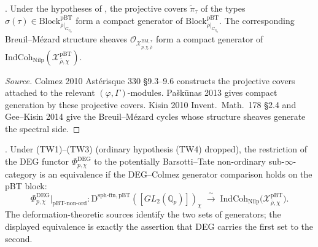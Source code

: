 \begin{lemma}
\label{v4-arith:w6-e:lem:Colmez-pBT-gen}
\ClaimStatusProvedElsewhere. Under the hypotheses of
, the projective covers
\(\widetilde{\pi}_{\tau}\) of the types
\(\sigma(\tau)\in\mathrm{Block}^{\mathrm{pBT}}_{\bar\rho|_{G_{\mathbb{Q}_{p}}}}\)
form a compact generator of
\(\mathrm{Block}^{\mathrm{pBT}}_{\bar\rho|_{G_{\mathbb{Q}_{p}}}}\). The
corresponding Breuil--M{\'e}zard structure sheaves
\(\mathcal{O}_{\mathcal{X}^{\mathrm{BM},\tau}_{p,\chi,\bar\rho}}\)
form a compact generator of
\(\mathrm{IndCoh}_{\mathrm{Nilp}}(\mathcal{X}^{\mathrm{pBT}}_{\bar\rho,\chi})\).
\end{lemma}

\begin{proof}[Source]
Colmez 2010 Ast{\'e}risque 330 \S 9.3--9.6 constructs the projective
covers attached to the relevant \((\varphi,\Gamma)\)-modules.
Pa{\v s}k{\=u}nas 2013 gives compact generation by these projective
covers. Kisin 2010 Invent.~Math.~178 \S 2.4 and Gee--Kisin 2014 give
the Breuil--M{\'e}zard cycles whose structure sheaves generate the
spectral side.
\end{proof}

\begin{theorem}
\label{v4-arith:w6-e:thm:f1a1-pBT-nonord}
\ClaimStatusNeedsVerification. Under 
(TW1)--(TW3) (ordinary hypothesis (TW4) dropped), the restriction of
the DEG functor \(\Phi^{\mathrm{DEG}}_{p,\chi}\) to the potentially
Barsotti--Tate non-ordinary sub-\(\infty\)-category is an equivalence
if the DEG--Colmez generator comparison holds on the pBT block:
\[
\Phi^{\mathrm{DEG}}_{p,\chi}\big|_{\mathrm{pBT\text{-}non\text{-}ord}}\colon
\mathrm{D}^{\mathrm{sph\text{-}fin,pBT}}([GL_{2}(\mathbb{Q}_{p})])_{\chi}
\;\xrightarrow{\;\sim\;}\;
\mathrm{IndCoh}_{\mathrm{Nilp}}\bigl(\mathcal{X}^{\mathrm{pBT}}_{\bar\rho,\chi}\bigr).
\]
The deformation-theoretic sources identify the two sets of generators;
the displayed equivalence is exactly the assertion that DEG carries the
first set to the second.
\end{theorem}

